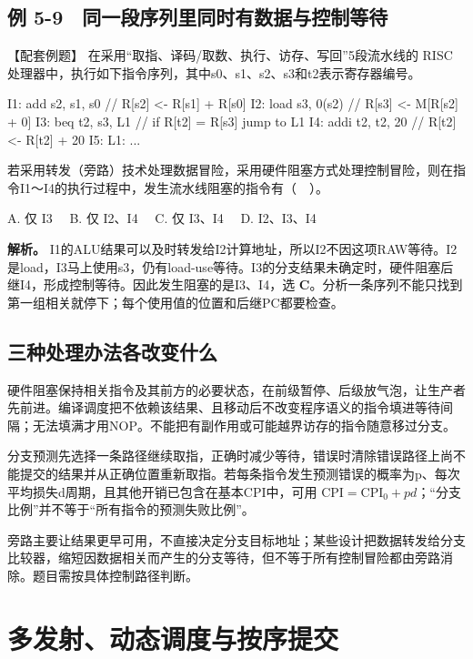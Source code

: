 \subsection{例 5-9　同一段序列里同时有数据与控制等待}\label{CO05-example-9}

【配套例题】 在采用``取指、译码/取数、执行、访存、写回''5段流水线的 RISC 处理器中，执行如下指令序列，其中s0、s1、s2、s3和t2表示寄存器编号。

\begin{codeblock}[language={}]
I1: add  s2, s1, s0  // R[s2] <- R[s1] + R[s0]
I2: load s3, 0(s2)   // R[s3] <- M[R[s2] + 0]
I3: beq  t2, s3, L1  // if R[t2] = R[s3] jump to L1
I4: addi t2, t2, 20  // R[t2] <- R[t2] + 20
I5: L1: ...
\end{codeblock}

若采用转发（旁路）技术处理数据冒险，采用硬件阻塞方式处理控制冒险，则在指令I1～I4的执行过程中，发生流水线阻塞的指令有（　）。

A. 仅 I3　 B. 仅 I2、I4　 C. 仅 I3、I4　 D. I2、I3、I4

\textbf{解析。} I1的ALU结果可以及时转发给I2计算地址，所以I2不因这项RAW等待。I2是load，I3马上使用s3，仍有load-use等待。I3的分支结果未确定时，硬件阻塞后继I4，形成控制等待。因此发生阻塞的是I3、I4，选 \textbf{C}。分析一条序列不能只找到第一组相关就停下；每个使用值的位置和后继PC都要检查。

\subsection{三种处理办法各改变什么}\label{ux4e09ux79cdux5904ux7406ux529eux6cd5ux5404ux6539ux53d8ux4ec0ux4e48}

硬件阻塞保持相关指令及其前方的必要状态，在前级暂停、后级放气泡，让生产者先前进。编译调度把不依赖该结果、且移动后不改变程序语义的指令填进等待间隔；无法填满才用NOP。不能把有副作用或可能越界访存的指令随意移过分支。

分支预测先选择一条路径继续取指，正确时减少等待，错误时清除错误路径上尚不能提交的结果并从正确位置重新取指。若每条指令发生预测错误的概率为p、每次平均损失d周期，且其他开销已包含在基本CPI中，可用 \(\mathrm{CPI}=\mathrm{CPI}_{0}+pd\)；``分支比例''并不等于``所有指令的预测失败比例''。

旁路主要让结果更早可用，不直接决定分支目标地址；某些设计把数据转发给分支比较器，缩短因数据相关而产生的分支等待，但不等于所有控制冒险都由旁路消除。题目需按具体控制路径判断。

\section{多发射、动态调度与按序提交}\label{CO05-issue}

